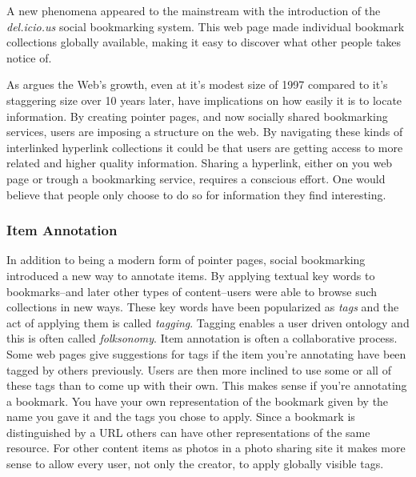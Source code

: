 
A new phenomena appeared to the mainstream with the introduction of the
\emph{del.icio.us}%
\sidenote{
}
social bookmarking system. This web page made individual
bookmark collections globally available, making it easy to discover what other
people takes notice of.

As \citet[p.~806]{dieberger97} argues the Web's growth, even at it's modest
size of 1997 compared to it's staggering size over 10 years later, have
implications on how easily it is to locate information. By creating pointer
pages, and now socially shared bookmarking services, users are imposing a
structure on the web. By navigating these kinds of interlinked hyperlink
collections it could be that users are getting access to more related and
higher quality information. Sharing a hyperlink, either on you web page or
trough a bookmarking service, requires a conscious effort. One would believe
that people only choose to do so for information they find interesting.

\subsubsection{Item Annotation}

In addition to being a modern form of pointer pages, social bookmarking
introduced a new way to annotate items. By applying textual key words to
bookmarks--and later other types of content--users were able to browse such
collections in new ways. These key words have been popularized as \emph{tags}
and the act of applying them is called \emph{tagging}. Tagging enables a user
driven ontology and this is often called \emph{folksonomy}.
Item annotation is often a collaborative process. Some web pages give
suggestions for tags if the item you're annotating have been tagged by others
previously. Users are then more inclined to use some or all of these tags than
to come up with their own. This makes sense if you're annotating a bookmark.
You have your own representation of the bookmark given by the name you gave it
and the tags you chose to apply. Since a bookmark is distinguished by a
URL others can have other representations of the same resource. For other
content items as photos in a photo sharing site it makes more sense to allow
every user, not only the creator, to apply globally visible tags.

